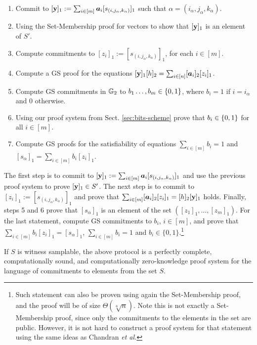 \begin{enumerate}
\item Commit to $[\mathbf{y}]_1:=\sum_{i\in[m]}{\boldsymbol a}_i[s_{(i,j_\alpha,k_\alpha)}]_1$ such that $\alpha=(i_\alpha,j_\alpha,k_\alpha)$.
\item Using the Set-Membership proof for vectors to show that $[\mathbf{y}]_1$ is an element of $S'$.
\item Compute commitments to $[z_i]_1:=[s_{(i,j_\alpha,k_\alpha)}]_1$, for each $i\in[m]$.
\item Compute a GS proof for the equations $[\mathbf{y}]_1[h]_2=\sum_{i\in[n]}[{\boldsymbol a}_i]_2 [z_i]_1$. 
\item Compute GS commitments in $\mathbb{G}_2$ to $b_1\ldots,b_m\in\{0,1\}$,
      where $b_i = 1$ if $i=i_\alpha$ and $0$ otherwise.
\item Using our proof system from Sect. \ref{sec:bits-scheme} prove that $b_i\in\{0,1\}$ for all $i\in[m]$.
\item Compute GS proofs for the satisfiability of equations $\sum_{i\in[m]}b_i=1$ and $[s_{\alpha}]_1=\sum_{i\in[m]}b_i[z_i]_1$.
\end{enumerate}

The first step is to commit to $[\mathbf{y}]_1:= \sum_{i\in[m]} {\boldsymbol a}_i [s_{(i,j_\alpha,k_\alpha)}]_1$ and use the previous proof system to prove $[\mathbf{y}]_1 \in S'$. The next step is to commit to $[z_i]_1:=[s_{(i,j_\alpha,k_\alpha)}]_1$ and prove that $\sum_{i\in[m]}[{\boldsymbol a}_i]_2[z_i]_1 = [h]_2[\mathbf{y}]_1$ holds. Finally, steps 5 and 6 prove that $[s_{\alpha}]_1$ is an element of the set $([z_1]_1,\ldots,[z_m]_1)$. For the last statement, compute GS commitments to $b_i$, $i \in [m]$, 
and prove that $\sum_{i\in[m]}b_i[z_i]_1=[s_{\alpha}]_1$, $\sum_{i\in[m]}b_i=1$ and $b_i \in \{0,1\}$.\footnote{Such statement can also be proven using again the Set-Membership proof, and the proof will be of size $\Theta(\sqrt[6]{n})$. Note this is not exactly a Set-Membership proof, since only the commitments to the elements in the set are public. However, it is not hard to construct a proof system for that statement using the same ideas as Chandran \textit{et al.} }

\begin{theorem}
If $S$ is witness samplable, the above protocol is a perfectly complete, computationally sound, and computationally zero-knowledge proof system for the language of commitments to elements from the set $S$.
\end{theorem}

